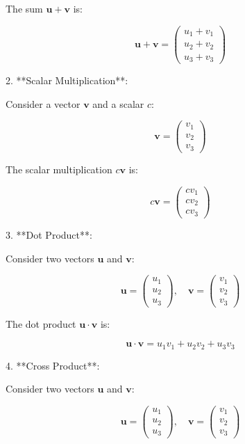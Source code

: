 \documentclass{article}
\begin{document}
   The sum \( \mathbf{u} + \mathbf{v} \) is:

   \[
   \mathbf{u} + \mathbf{v} = \begin{pmatrix}
   u_1 + v_1 \\
   u_2 + v_2 \\
   u_3 + v_3
   \end{pmatrix}
   \]

    

2. **Scalar Multiplication**:
 
   Consider a vector \( \mathbf{v} \) and a scalar \( c \):

   \[
   \mathbf{v} = \begin{pmatrix}
   v_1 \\
   v_2 \\
   v_3
   \end{pmatrix}
   \]

   The scalar multiplication \( c \mathbf{v} \) is:

   \[
   c \mathbf{v} = \begin{pmatrix}
   c v_1 \\
   c v_2 \\
   c v_3
   \end{pmatrix}
   \]



3. **Dot Product**:
 
   Consider two vectors \( \mathbf{u} \) and \( \mathbf{v} \):

   \[
   \mathbf{u} = \begin{pmatrix}
   u_1 \\
   u_2 \\
   u_3
   \end{pmatrix}, \quad
   \mathbf{v} = \begin{pmatrix}
   v_1 \\
   v_2 \\
   v_3
   \end{pmatrix}
   \]

   The dot product \( \mathbf{u} \cdot \mathbf{v} \) is:

   \[
   \mathbf{u} \cdot \mathbf{v} = u_1 v_1 + u_2 v_2 + u_3 v_3
   \]

 

4. **Cross Product**:
 
   Consider two vectors \( \mathbf{u} \) and \( \mathbf{v} \):

   \[
   \mathbf{u} = \begin{pmatrix}
   u_1 \\
   u_2 \\
   u_3
   \end{pmatrix}, \quad
   \mathbf{v} = \begin{pmatrix}
   v_1 \\
   v_2 \\
   v_3
   \end{pmatrix}
   \]
\end{document}
